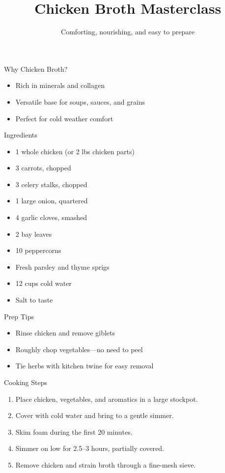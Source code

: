 \documentclass{beamer}
\title{Chicken Broth Masterclass}
\subtitle{Comforting, nourishing, and easy to prepare}
\author{}
\date{}
\begin{document}
\begin{frame}
  \titlepage
\end{frame}

\begin{frame}{Why Chicken Broth?}
  \begin{itemize}
    \item Rich in minerals and collagen
    \item Versatile base for soups, sauces, and grains
    \item Perfect for cold weather comfort
  \end{itemize}
\end{frame}

\begin{frame}{Ingredients}
  \begin{itemize}
    \item 1 whole chicken (or 2 lbs chicken parts)
    \item 3 carrots, chopped
    \item 3 celery stalks, chopped
    \item 1 large onion, quartered
    \item 4 garlic cloves, smashed
    \item 2 bay leaves
    \item 10 peppercorns
    \item Fresh parsley and thyme sprigs
    \item 12 cups cold water
    \item Salt to taste
  \end{itemize}
\end{frame}

\begin{frame}{Prep Tips}
  \begin{itemize}
    \item Rinse chicken and remove giblets
    \item Roughly chop vegetables---no need to peel
    \item Tie herbs with kitchen twine for easy removal
  \end{itemize}
\end{frame}

\begin{frame}{Cooking Steps}
  \begin{enumerate}
    \item Place chicken, vegetables, and aromatics in a large stockpot.
    \item Cover with cold water and bring to a gentle simmer.
    \item Skim foam during the first 20 minutes.
    \item Simmer on low for 2.5--3 hours, partially covered.
    \item Remove chicken and strain broth through a fine-mesh sieve.
  \end{enumerate}
\end{frame}
\end{document}

